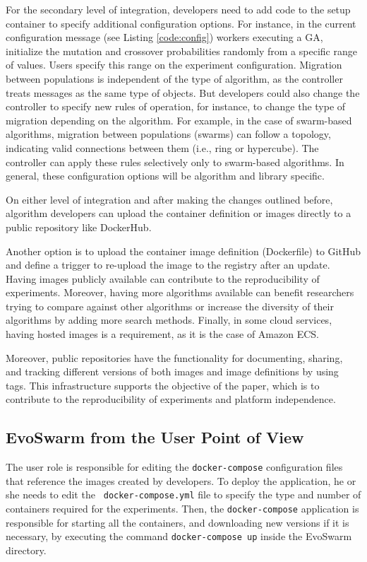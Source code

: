 \documentclass[review]{elsarticle}
\begin{document}
For the secondary level of integration, developers need to add code to the setup
container to specify additional configuration options. For instance,
in the current configuration message (see Listing \ref{code:config})
workers executing a GA, initialize the mutation and crossover 
probabilities randomly from a specific range of values. Users specify
this range on the experiment configuration. 
Migration between populations is independent of the type of algorithm, as the
controller treats messages as the same type of objects. But developers could
also change the controller to specify new rules of operation, for instance, to
change the type of migration depending on the algorithm. 
For example, in the case of swarm-based algorithms,  migration between  
populations (swarms) can follow a topology, indicating valid connections 
between them (i.e., ring or hypercube). The controller
can apply these rules selectively only to swarm-based algorithms. 
In general, these configuration options will be algorithm and library specific. 

On either level of integration and after making the changes outlined before,
algorithm developers can upload the container 
definition or images directly to a public repository like DockerHub. 

Another option is to upload the container image definition (Dockerfile) to GitHub and
define a trigger to re-upload the image to the registry after an update. Having
images publicly available can contribute to the reproducibility of experiments.
Moreover, having more algorithms available can benefit researchers trying to
compare against other algorithms or increase the diversity of their algorithms
by adding more search methods. Finally, in some cloud services, having hosted
images is a requirement, as it is the case of Amazon ECS.

Moreover, public repositories have the functionality for documenting, sharing,
and tracking different versions of both images and image definitions by using
tags. This infrastructure supports the objective of the paper, which is to
contribute to the reproducibility of experiments and platform independence.

\subsection{EvoSwarm from the User Point of View} 
\label{sec:evoswarm:config}

The user role is responsible for
editing the {\tt docker-compose} configuration files that reference the images created
by developers. To deploy the application, he or she needs to edit the {\tt
docker-compose.yml} file to specify the type and number of containers required
for the experiments. Then, the {\tt docker-compose} application is responsible for
starting all the containers, and downloading new versions if it is necessary,
by executing the command {\tt docker-compose up}  inside the EvoSwarm directory.
\end{document}

